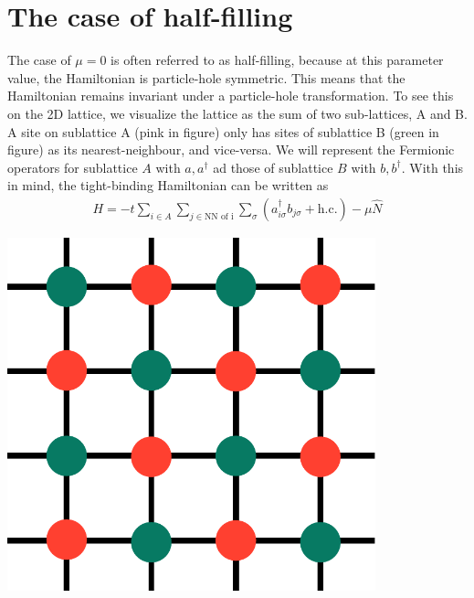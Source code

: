 \documentclass{article}
\begin{document}
\section{The case of half-filling}
\begin{minipage}{0.6\textwidth}
	The case of \(\mu=0\) is often referred to as half-filling, because at this parameter value, the Hamiltonian is particle-hole symmetric. This means that the Hamiltonian remains invariant under a particle-hole transformation. To see this on the 2D lattice, we visualize the lattice as the sum of two sub-lattices, A and B. A site on sublattice A (pink in figure) only has sites of sublattice B (green in figure) as its nearest-neighbour, and vice-versa. We will represent the Fermionic operators for sublattice \(A\) with \(a,a^\dagger\) ad those of sublattice \(B\) with \(b, b^\dagger\). With this in mind, the tight-binding Hamiltonian can be written as
\begin{equation}\begin{aligned}
	H = -t\sum_{i \in A}\sum_{j \in \text{NN of i}} \sum_\sigma\left(a^\dagger_{i \sigma}b_{j\sigma} + \text{h.c.}\right) - \mu \hat N
\end{aligned}\end{equation}
\end{minipage}
\hspace*{\fill}
\begin{minipage}{0.35\textwidth}
	\centering
	\includegraphics[width=0.8\textwidth]{./sublattice.pdf}
\end{minipage}
\end{document}
